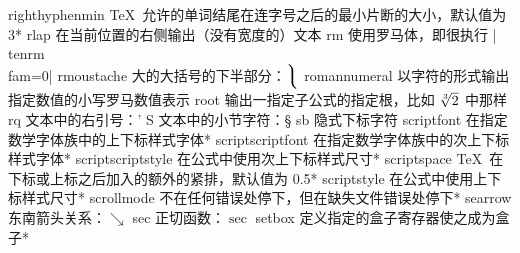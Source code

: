 \capcs righthyphenmin {\TeX\ 允许的单词结尾在连字号之后的最小片断的大小，默认值为 3}*{}
\capcs rlap {在当前位置的右侧输出（没有宽度的）文本}{}{}
\capcs rm {使用罗马体，即很执行 |\\tenrm\\fam=0|}{}{}
\capcs rmoustache {大的大括号的下半部分：$\big\rmoustache$}{}{}
\capcs romannumeral {以字符的形式输出指定数值的小写罗马数值表示}{}{}
\capcs root {输出一指定子公式的指定根，比如 $\root 3 \of 2$ 中那样}{}{}
\capcs rq {文本中的右引号：\rq}{}{}
\capcs S {文本中的小节字符：\S}{}{}
\capcs sb {隐式下标字符}{}{}
\capcs scriptfont {在指定数学字体族中的上下标样式字体}*{}
\capcs scriptscriptfont {在指定数学字体族中的次上下标样式字体}*{}
\capcs scriptscriptstyle {在公式中使用次上下标样式尺寸}*{}
\capcs scriptspace {\TeX\ 在下标或上标之后加入的额外的紧排，默认值为 0.5\pt}*{}
\capcs scriptstyle {在公式中使用上下标样式尺寸}*{}
\capcs scrollmode {不在任何错误处停下，但在缺失文件错误处停下}*{}
\capcs searrow {东南箭头关系：$\searrow$}{}{}
\capcs sec {正切函数：$\sec$}{}{}
\capcs setbox {定义指定的盒子寄存器使之成为盒子}*{}
